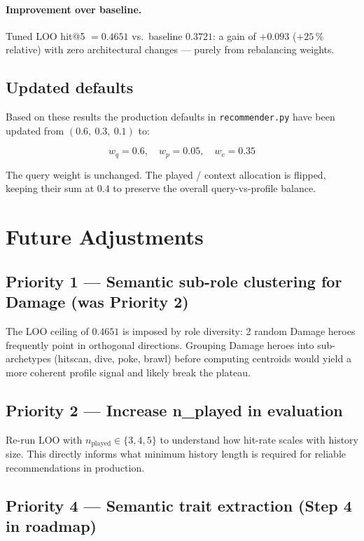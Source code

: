 \documentclass[11pt, a4paper]{article}
\begin{document}
\paragraph{Improvement over baseline.}
Tuned LOO hit@5 $= 0.4651$ vs.\ baseline $0.3721$: a gain of
$+0.093$ ($+25\,\%$ relative) with zero architectural changes — purely from
rebalancing weights.

\subsection{Updated defaults}

Based on these results the production defaults in \texttt{recommender.py} have
been updated from $(0.6,\ 0.3,\ 0.1)$ to:

\begin{equation}
w_q = 0.6, \quad w_p = 0.05, \quad w_c = 0.35
\label{eq:tuned}
\end{equation}

The query weight is unchanged.  The played / context allocation is flipped,
keeping their sum at $0.4$ to preserve the overall query-vs-profile balance.

\section{Future Adjustments}

\subsection{Priority 1 — Semantic sub-role clustering for Damage (was Priority 2)}

The LOO ceiling of $0.4651$ is imposed by role diversity: 2 random Damage
heroes frequently point in orthogonal directions.  Grouping Damage heroes into
sub-archetypes (hitscan, dive, poke, brawl) before computing centroids would
yield a more coherent profile signal and likely break the plateau.

\subsection{Priority 2 — Increase n\_played in evaluation}

Re-run LOO with $n_\text{played} \in \{3, 4, 5\}$ to understand how hit-rate
scales with history size.  This directly informs what minimum history length
is required for reliable recommendations in production.

\subsection{Priority 4 — Semantic trait extraction (Step 4 in roadmap)}
\end{document}
